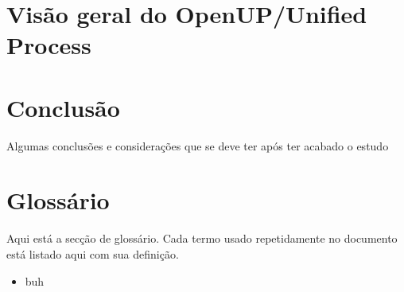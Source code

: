 \documentclass[a4paper, 12pt, onecolumn, oneside]{scrartcl}
\begin{document}
\section{Visão geral do OpenUP/Unified Process}


\section{Conclusão}
Algumas conclusões e considerações que se deve ter após
ter acabado o estudo

\clearpage
\section{Glossário}\label{glossary}

Aqui está a secção de glossário. Cada termo usado repetidamente no documento está listado aqui com sua definição.

\begin{itemize}
  \item buh
\end{itemize}
\end{document}
